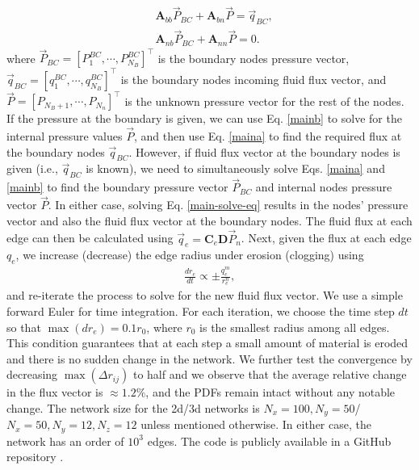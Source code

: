 \documentclass[%
reprint,
 amsmath,amssymb,
 aps,
prl,
]{revtex4-1}
\begin{document}
%
\begin{subequations}\label{main-solve-eq}
\begin{align}
  & \mathbf{A}_{bb} \vec{P}_{BC} + \mathbf{A}_{bn}  \vec{P} = \vec{q}_{BC}, \label{maina} \\
& \mathbf{A}_{nb}\vec{P}_{BC} +  \mathbf{A}_{nn} \vec{P} = 0. \label{mainb}
 \end{align}
\end{subequations}
%
where $\vec{P}_{BC} = [P^{BC}_1, \cdots, P^{BC}_{N_B}]^\top$ is the boundary nodes pressure vector, $\vec{q}_{BC} = [q^{BC}_1, \cdots, q^{BC}_{N_B}]^\top$ is the boundary nodes incoming fluid flux vector, and $\vec{P} = [P_{N_B+1}, \cdots, P_{N_n}]^\top$ is the unknown pressure vector for the rest of the nodes. If the pressure at the boundary is given,  we can use Eq. \eqref{mainb} to solve for the internal pressure values $\vec{P}$, and then use Eq. \eqref{maina} to find the required flux at the boundary nodes $\vec{q}_{BC}$. However, if fluid flux vector at the boundary nodes is given (i.e., $\vec{q}_{BC}$ is known), we need to simultaneously solve  Eqs. \eqref{maina} and \eqref{mainb} to find the boundary pressure vector  $\vec{P}_{BC}$ and internal nodes pressure vector $\vec{P}$. In either case, solving Eq. \eqref{main-solve-eq}  results in the nodes' pressure vector and also the fluid flux vector at the boundary nodes. The fluid flux at each edge can then be calculated using  $\vec{q}_e=\mathbf{C}_e \mathbf{D} \vec{P}_n$. Next, given the flux at each edge  $q_e$, we increase (decrease) the edge radius under erosion (clogging) using 
%
\begin{align}
    \frac{dr_e}{dt} \propto \pm  \frac{q^m_e}{r_e^n},
\end{align}
%
and re-iterate the process to solve for the new fluid flux vector. We use a simple forward Euler for time integration. For each iteration, we choose the time step $dt$ so that $\max(dr_e) = 0.1 r_0$, where $r_0$ is the smallest radius among all edges. 
This condition guarantees that at each step a small amount of material is eroded and there is no sudden change in the network. We further test the convergence by decreasing $\max(\Delta r_{ij})$ to half and we observe that the average relative change in the flux vector is $\approx 1.2\%$, and the PDFs remain intact without any notable change. The network size for the 2d/3d networks is $N_x=100,N_y=50$/$N_x=50,N_y=12, N_z=12$ unless mentioned otherwise. In either case, the network has an order of $10^3$ edges. The code is publicly available in a GitHub repository \cite{githubrepo}. 
\end{document}

